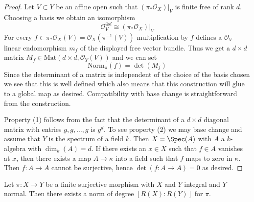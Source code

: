 \begin{proof}
Let $V \subset Y$ be an affine open such that $(\pi_*\mathcal{O}_X)|_V$
is finite free of rank $d$. Choosing a basis we obtain an isomorphism
$$
\mathcal{O}_V^{\oplus d} \cong (\pi_*\mathcal{O}_X)|_V
$$
For every $f \in \pi_*\mathcal{O}_X(V) = \mathcal{O}_X(\pi^{-1}(V))$
multiplication by $f$ defines a $\mathcal{O}_V$-linear endomorphism
$m_f$ of the displayed free vector bundle. Thus we get a $d \times d$
matrix $M_f \in \text{Mat}(d \times d, \mathcal{O}_Y(V))$ and we can set
$$
\text{Norm}_\pi(f) = \det(M_f)
$$
Since the determinant of a matrix is independent of the choice of
the basis chosen we see that this is well defined which also means
that this construction will glue to a global map as desired.
Compatibility with base change is straightforward from the construction.

\medskip\noindent
Property (1) follows from the fact that the determinant of a
$d \times d$ diagonal matrix with entries $g, g, \ldots, g$ is $g^d$.
To see property (2) we may base change and assume that $Y$ is the
spectrum of a field $k$. Then $X = \Spec(A)$ with $A$ a $k$-algebra
with $\dim_k(A) = d$. If there exists an $x \in X$ such that
$f \in A$ vanishes at $x$, then there exists a map $A \to \kappa$
into a field such that $f$ maps to zero in $\kappa$. Then
$f : A \to A$ cannot be surjective, hence $\det(f : A \to A) = 0$
as desired.
\end{proof}

\begin{lemma}
\label{lemma-norm-in-normal-case}
Let $\pi : X \to Y$ be a finite surjective morphism with $X$ and $Y$
integral and $Y$ normal. Then there exists a norm of degree
$[R(X) : R(Y)]$ for $\pi$.
\end{lemma}

